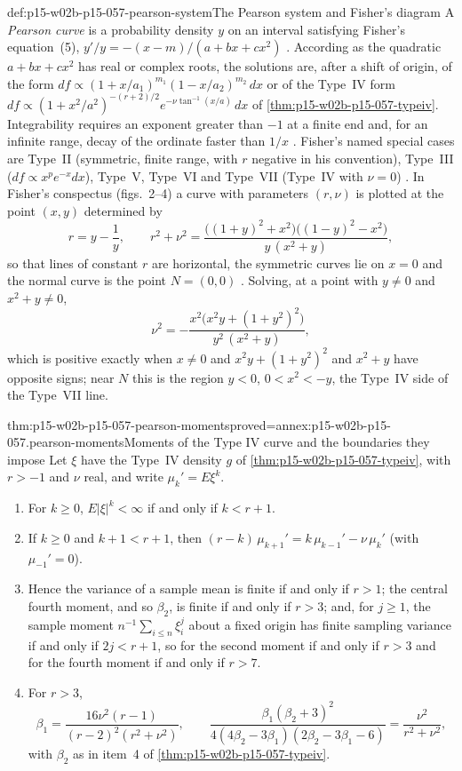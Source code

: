 \begin{hbdefinition}{def:p15-w02b-p15-057-pearson-system}{The Pearson system and Fisher's diagram}
A \emph{Pearson curve} is a probability density \(y\) on an interval
satisfying Fisher's equation~(5),
\(y'/y=-(x-m)/(a+bx+cx^2)\) \cite[p.~342]{Fisher1922Foundations}.
According as the quadratic \(a+bx+cx^2\) has real or complex roots,
the solutions are, after a shift of origin, of the form
\(df\propto(1+x/a_1)^{m_1}(1-x/a_2)^{m_2}\,dx\) or of the Type~IV form
\(df\propto(1+x^2/a^2)^{-(r+2)/2}e^{-\nu\tan^{-1}(x/a)}\,dx\) of
\cref{thm:p15-w02b-p15-057-typeiv}. Integrability requires an exponent
greater than \(-1\) at a finite end and, for an infinite range, decay of
the ordinate faster than \(1/x\) \cite[p.~343]{Fisher1922Foundations}.
Fisher's named special cases are Type~II (symmetric, finite range, with
\(r\) negative in his convention), Type~III (\(df\propto x^pe^{-x}dx\)),
Type~V, Type~VI and Type~VII (Type~IV with \(\nu=0\))
\cite[pp.~344--345]{Fisher1922Foundations}. In Fisher's conspectus
(figs.~2--4) a curve with parameters \((r,\nu)\) is plotted at the point
\((x,y)\) determined by
\[
 r=y-\frac1y,\qquad
 r^2+\nu^2=\frac{\bigl((1+y)^2+x^2\bigr)\bigl((1-y)^2-x^2\bigr)}{y\,(x^2+y)},
\]
so that lines of constant \(r\) are horizontal, the symmetric curves lie on
\(x=0\) and the normal curve is the point \(N=(0,0)\)
\cite[p.~345]{Fisher1922Foundations}. Solving, at a point with \(y\neq0\)
and \(x^2+y\neq0\),
\[
 \nu^2=-\frac{x^2\bigl(x^2y+(1+y^2)^2\bigr)}{y^2\,(x^2+y)},
\]
which is positive exactly when \(x\neq0\) and \(x^2y+(1+y^2)^2\) and
\(x^2+y\) have opposite signs; near \(N\) this is the region \(y<0\),
\(0<x^2<-y\), the Type~IV side of the Type~VII line.
\end{hbdefinition}

\begin{hbtheorem}{thm:p15-w02b-p15-057-pearson-moments}{proved=annex:p15-w02b-p15-057.pearson-moments}{Moments of the Type IV curve and the boundaries they impose}
Let \(\xi\) have the Type~IV density \(g\) of
\cref{thm:p15-w02b-p15-057-typeiv}, with \(r>-1\) and \(\nu\) real, and
write \(\mu_k'=E\xi^k\).
\begin{enumerate}
\item For \(k\geq0\), \(E|\xi|^k<\infty\) if and only if \(k<r+1\).
\item If \(k\geq0\) and \(k+1<r+1\), then
 \((r-k)\,\mu_{k+1}'=k\,\mu_{k-1}'-\nu\,\mu_k'\) (with \(\mu_{-1}'=0\)).
\item Hence the variance of a sample mean is finite if and only if
 \(r>1\); the central fourth moment, and so \(\beta_2\), is finite if and
 only if \(r>3\); and, for \(j\geq1\), the sample moment
 \(n^{-1}\sum_{i\leq n}\xi_i^j\) about a fixed origin has finite sampling
 variance if and only if \(2j<r+1\), so for the second moment if and only
 if \(r>3\) and for the fourth moment if and only if \(r>7\).
\item For \(r>3\),
 \[
  \beta_1=\frac{16\nu^2(r-1)}{(r-2)^2(r^2+\nu^2)},\qquad
  \frac{\beta_1(\beta_2+3)^2}{4(4\beta_2-3\beta_1)(2\beta_2-3\beta_1-6)}
  =\frac{\nu^2}{r^2+\nu^2},
 \]
 with \(\beta_2\) as in item~4 of \cref{thm:p15-w02b-p15-057-typeiv}.
\end{enumerate}
\end{hbtheorem}

